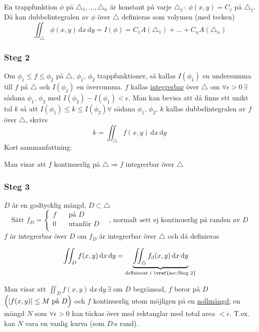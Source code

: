 \documentclass[a4paper]{article}
\DeclarePairedDelimiter \abs{\lvert}{\rvert}
\begin{document}
En trappfunktion $\phi$ på $\triangle_1,\ldots,\triangle_n$ är konstant på varje $\triangle_j \,:\, \phi(x,y) = C_j$ på $\triangle_j$. Då kan dubbelintegralen av $\phi$ över $\triangle$ definieras som volymen (med tecken)
$$
	\iint_\triangle \phi(x,y) \,\mathrm{d}x\,\mathrm{d}y = I(\phi) = C_1A(\triangle_1) + \ldots + C_nA(\triangle_n)
$$

\newpage
\subsubsection{Steg 2} \label{sec:Steg 2}
Om $\phi_1 \leq f \leq \phi_2$ på $\triangle$, $\phi_1, \, \phi_2$ trappfunktioner, så kallas $I(\phi_1)$ en undersumma till $f$ på $\triangle$ och $I(\phi_2)$ en översumma. 
$f$ kallas \underline{integrerbar} över $\triangle$ om $\forall \epsilon > 0 \, \exists$ sådana $\phi_1, \, \phi_2$ med $I(\phi_2) - I(\phi_1) < \epsilon$.
Man kan bevisa att då finns ett unikt tal $k$ så att $I(\phi_1) \leq k \leq I(\phi_2) \forall$ sådana $\phi_1, \, \phi_2, \, k$ kallas dubbelintegralen av $f$ över $\triangle$, skrivs
$$
	k = \iint_\triangle f(x,y) \,\mathrm{d}x\,\mathrm{d}y
$$
Kort sammanfattning:
\begin{framed}
	Man visar att $f$ kontinuerlig på $\triangle \Rightarrow f$ integrerbar över $\triangle$
\end{framed}

\subsubsection{Steg 3}
$D$ är en godtycklig mängd, $D \subset \triangle$ \newline
$$
	\text{Sätt } f_D = 
	\begin{cases}
		f & \quad \text{på } D \\
		0 & \quad \text{utanför } D \\
  	\end{cases}
  	\quad \text{, normalt sett ej kontinuerlig på randen av } D
$$
$f$ är integrerbar över $D$ om $f_D$ är integrerbar över $\triangle$ och då definieras

$$
	\iint_D f(x,y) \,\mathrm{d}x\,\mathrm{d}y = \underbrace{\iint_\triangle f_\mathrm{d}(x,y) \,\mathrm{d}x\,\mathrm{d}y}_{\text{definierat i \vref{sec:Steg 2}}}
$$

Man visar att $\iint_D f(x,y) \,\mathrm{d}x\,\mathrm{d}y \, \exists$ om $D$ begränsad, $f$ beror på $D$ $\Big( \abs{f(x,y)} \leq M \text{ på } D \Big)$ och $f$ kontinuerlig utom möjligen på en \underline{nollmängd};
en mängd $N$ som $\forall \epsilon > 0$ kan täckas över med rektanglar med total area $< \epsilon$. T.ex. kan $N$ vara en vanlig kurva (som $D$:s rand). \newline
\end{document}
